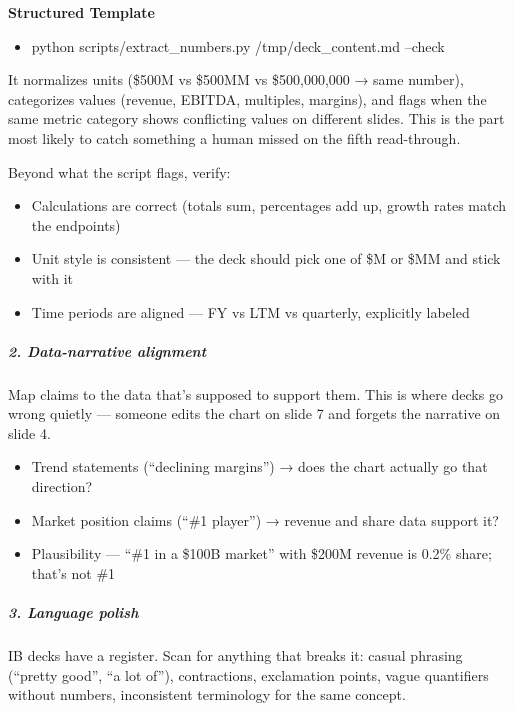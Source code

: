 \documentclass[11pt]{article}
\begin{document}
\textbf{Structured Template}
\begin{itemize}[leftmargin=*,itemsep=2pt,topsep=2pt]
\item {} python scripts/extract\_\allowbreak{}numbers.py /tmp/deck\_\allowbreak{}content.md --check
\end{itemize}

It normalizes units (\$500M vs \$500MM vs \$500,000,000 → same number), categorizes values (revenue, EBITDA, multiples, margins), and flags when the same metric category shows conflicting values on different slides. This is the part most likely to catch something a human missed on the fifth read-through.


Beyond what the script flags, verify:

\begin{itemize}[leftmargin=*,itemsep=2pt,topsep=2pt]
\item {} Calculations are correct (totals sum, percentages add up, growth rates match the endpoints)
\item {} Unit style is consistent — the deck should pick one of \$M or \$MM and stick with it
\item {} Time periods are aligned — FY vs LTM vs quarterly, explicitly labeled
\end{itemize}

\subparagraph{2. Data-narrative alignment}\mbox{}\par

Map claims to the data that's supposed to support them. This is where decks go wrong quietly — someone edits the chart on slide 7 and forgets the narrative on slide 4.


\begin{itemize}[leftmargin=*,itemsep=2pt,topsep=2pt]
\item {} Trend statements (``declining margins'') → does the chart actually go that direction?
\item {} Market position claims (``\#1 player'') → revenue and share data support it?
\item {} Plausibility — ``\#1 in a \$100B market'' with \$200M revenue is 0.2\% share; that's not \#1
\end{itemize}

\subparagraph{3. Language polish}\mbox{}\par

IB decks have a register. Scan for anything that breaks it: casual phrasing (``pretty good'', ``a lot of''), contractions, exclamation points, vague quantifiers without numbers, inconsistent terminology for the same concept.
\end{document}

